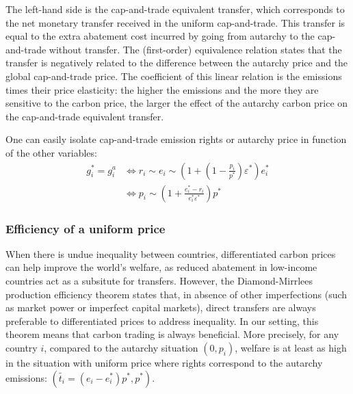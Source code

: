 \documentclass[12pt,english]{article}
\begin{document}
The left-hand side is the cap-and-trade equivalent transfer, which corresponds to the net monetary transfer received in the uniform cap-and-trade. This transfer is equal to the extra abatement cost incurred by going from autarchy to the cap-and-trade without transfer. The (first-order) equivalence relation states that the transfer is negatively related to the difference between the autarchy price and the global cap-and-trade price. The coefficient of this linear relation is the emissions times their price elasticity: the higher the emissions and the more they are sensitive to the carbon price, the larger the effect of the autarchy carbon price on the cap-and-trade equivalent transfer.

One can easily isolate cap-and-trade emission rights or autarchy price in function of the other variables: $$\begin{aligned}
g^*_i = g^a_i &\Leftrightarrow r_i \sim e_i \sim (1 + (1 - \frac{p_i}{p^*}) \varepsilon^*) e_i^*  \\
&\Leftrightarrow p_i \sim (1 + \frac{e^*_i - r_i}{e^*_i  \varepsilon^*}) p^*
\end{aligned}$$



\subsubsection*{Efficiency of a uniform price} \label{efficiency-of-a-uniform-price}

When there is undue inequality between countries, differentiated carbon prices can help improve the world's welfare, as reduced abatement in low-income countries act as a subsitute for transfers. However, the Diamond-Mirrlees production efficiency theorem states that, in absence of other imperfections (such as market power or imperfect capital markets), direct transfers are always preferable to differentiated prices to address inequality.\citep{diamond_optimal_1971} In our setting, this theorem means that carbon trading is always beneficial.  
More precisely, for any country $i$, compared to the autarchy situation $(0,p_i)$, welfare is at least as high in the situation with uniform price where rights correspond to the autarchy emissions: $(\widetilde{t_i}=(e_i - e^*_i)p^* ,p^*)$. 
\end{document}
